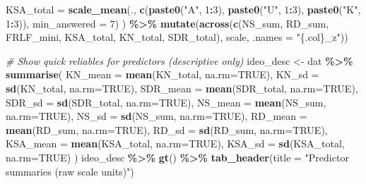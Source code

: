 \documentclass[
  10pt,
]{article}
\newenvironment{Shaded}{\begin{snugshade}}{\end{snugshade}}
\newcommand{\AttributeTok}[1]{\textcolor[rgb]{0.13,0.29,0.53}{#1}}
\newcommand{\CommentTok}[1]{\textcolor[rgb]{0.56,0.35,0.01}{\textit{#1}}}
\newcommand{\ConstantTok}[1]{\textcolor[rgb]{0.56,0.35,0.01}{#1}}
\newcommand{\DecValTok}[1]{\textcolor[rgb]{0.00,0.00,0.81}{#1}}
\newcommand{\FunctionTok}[1]{\textcolor[rgb]{0.13,0.29,0.53}{\textbf{#1}}}
\newcommand{\NormalTok}[1]{#1}
\newcommand{\OtherTok}[1]{\textcolor[rgb]{0.56,0.35,0.01}{#1}}
\newcommand{\SpecialCharTok}[1]{\textcolor[rgb]{0.81,0.36,0.00}{\textbf{#1}}}
\newcommand{\StringTok}[1]{\textcolor[rgb]{0.31,0.60,0.02}{#1}}
\begin{document}
\begin{Shaded}
\begin{Highlighting}[]
    \AttributeTok{KSA\_total  =} \FunctionTok{scale\_mean}\NormalTok{(., }\FunctionTok{c}\NormalTok{(}\FunctionTok{paste0}\NormalTok{(}\StringTok{"A"}\NormalTok{, }\DecValTok{1}\SpecialCharTok{:}\DecValTok{3}\NormalTok{), }\FunctionTok{paste0}\NormalTok{(}\StringTok{"U"}\NormalTok{, }\DecValTok{1}\SpecialCharTok{:}\DecValTok{3}\NormalTok{),}
                                 \FunctionTok{paste0}\NormalTok{(}\StringTok{"K"}\NormalTok{, }\DecValTok{1}\SpecialCharTok{:}\DecValTok{3}\NormalTok{)), }\AttributeTok{min\_answered =} \DecValTok{7}\NormalTok{)}
\NormalTok{  ) }\SpecialCharTok{\%\textgreater{}\%}
  \FunctionTok{mutate}\NormalTok{(}\FunctionTok{across}\NormalTok{(}\FunctionTok{c}\NormalTok{(NS\_sum, RD\_sum, FRLF\_mini, KSA\_total, KN\_total, SDR\_total), scale, }\AttributeTok{.names =} \StringTok{"\{.col\}\_z"}\NormalTok{))}

\CommentTok{\# Show quick reliables for predictors (descriptive only)}
\NormalTok{ideo\_desc }\OtherTok{\textless{}{-}}\NormalTok{ dat }\SpecialCharTok{\%\textgreater{}\%} \FunctionTok{summarise}\NormalTok{(}
  \AttributeTok{KN\_mean =} \FunctionTok{mean}\NormalTok{(KN\_total, }\AttributeTok{na.rm=}\ConstantTok{TRUE}\NormalTok{), }\AttributeTok{KN\_sd =} \FunctionTok{sd}\NormalTok{(KN\_total, }\AttributeTok{na.rm=}\ConstantTok{TRUE}\NormalTok{),}
  \AttributeTok{SDR\_mean =} \FunctionTok{mean}\NormalTok{(SDR\_total, }\AttributeTok{na.rm=}\ConstantTok{TRUE}\NormalTok{), }\AttributeTok{SDR\_sd =} \FunctionTok{sd}\NormalTok{(SDR\_total, }\AttributeTok{na.rm=}\ConstantTok{TRUE}\NormalTok{),}
  \AttributeTok{NS\_mean =} \FunctionTok{mean}\NormalTok{(NS\_sum, }\AttributeTok{na.rm=}\ConstantTok{TRUE}\NormalTok{), }\AttributeTok{NS\_sd =} \FunctionTok{sd}\NormalTok{(NS\_sum, }\AttributeTok{na.rm=}\ConstantTok{TRUE}\NormalTok{),}
  \AttributeTok{RD\_mean =} \FunctionTok{mean}\NormalTok{(RD\_sum, }\AttributeTok{na.rm=}\ConstantTok{TRUE}\NormalTok{), }\AttributeTok{RD\_sd =} \FunctionTok{sd}\NormalTok{(RD\_sum, }\AttributeTok{na.rm=}\ConstantTok{TRUE}\NormalTok{),}
  \AttributeTok{KSA\_mean =} \FunctionTok{mean}\NormalTok{(KSA\_total, }\AttributeTok{na.rm=}\ConstantTok{TRUE}\NormalTok{), }\AttributeTok{KSA\_sd =} \FunctionTok{sd}\NormalTok{(KSA\_total, }\AttributeTok{na.rm=}\ConstantTok{TRUE}\NormalTok{)}
\NormalTok{)}
\NormalTok{ideo\_desc }\SpecialCharTok{\%\textgreater{}\%} \FunctionTok{gt}\NormalTok{() }\SpecialCharTok{\%\textgreater{}\%} \FunctionTok{tab\_header}\NormalTok{(}\AttributeTok{title =} \StringTok{"Predictor summaries (raw scale units)"}\NormalTok{)}
\end{Highlighting}
\end{Shaded}
\end{document}
